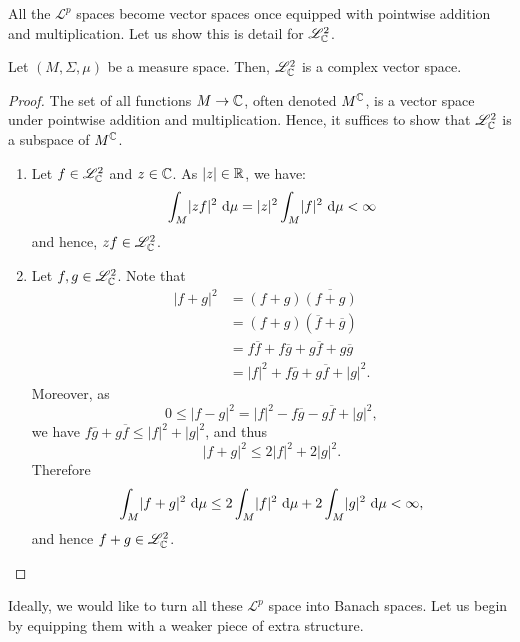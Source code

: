 All the $\mathscr{L}^p$ spaces become vector spaces once equipped with pointwise addition and multiplication. Let us show this is detail for $\mathscr{L}_{\mathbb{C}}^2$.

\begin{proposition}
Let $(M,\Sigma,\mu)$ be a measure space. Then, $\mathscr{L}_{\mathbb{C}}^2$ is a complex vector space.
\end{proposition}

\begin{proof}
The set of all functions $M\to\mathbb{C}$, often denoted $M^{\mathbb{C}}$, is a vector space under pointwise addition and multiplication. Hence, it suffices to show that $\mathscr{L}_{\mathbb{C}}^2$ is a subspace of $M^{\mathbb{C}}$.
\begin{enumerate}[label=(\roman*)]
\item Let $f \in \mathscr{L}_{\mathbb{C}}^2$ and $z\in \mathbb{C}$. As $|z|\in \mathbb{R}$, we have:
\begin{equation*}
\int_M \!  |z f|^2 \, \mathop{}\!\mathrm{d} \mu = |z|^2 \int_M \!  |f|^2 \, \mathop{}\!\mathrm{d} \mu < \infty
\end{equation*}
and hence, $z f \in \mathscr{L}_{\mathbb{C}}^2$.
\item Let $f,g \in \mathscr{L}_{\mathbb{C}}^2$. Note that
\begin{align*}
|f+g|^2 
&= (f+g)\overline{(f+g)}\\
&= (f+g)(\overline{f}+\overline{g})\\
&= f\overline{f}+f\overline{g}+g\overline{f}+g\overline{g} \\
&= |f|^2 +f\overline{g}+g\overline{f}+ |g|^2.
\end{align*}
Moreover, as
\begin{equation*}
0 \leq |f-g|^2 = |f|^2 -f\overline{g}-g\overline{f}+ |g|^2 ,
\end{equation*}
we have $f\overline{g}+g\overline{f} \leq |f|^2+ |g|^2$, and thus
\begin{equation*}
|f+g|^2 \leq 2 |f|^2+ 2|g|^2.
\end{equation*}
Therefore
\begin{equation*}
\int_M \!  |f+g|^2 \, \mathop{}\!\mathrm{d} \mu \leq 2\int_M \!  |f|^2 \, \mathop{}\!\mathrm{d} \mu + 2\int_M \!  |g|^2 \, \mathop{}\!\mathrm{d} \mu  < \infty ,
\end{equation*}
and hence $f+g \in \mathscr{L}_{\mathbb{C}}^2$.\qedhere
\end{enumerate}
\end{proof}

Ideally, we would like to turn all these $\mathscr{L}^p$ space into Banach spaces. Let us begin by equipping them with a weaker piece of extra structure.

